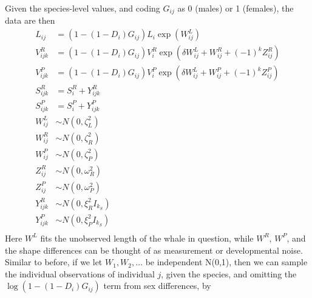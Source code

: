 \documentclass{article}
\begin{document}
Given the species-level values,
and coding $G_{ij}$ as 0 (males) or 1 (females),
the data are then
\begin{align}
    L_{ij} &= (1-(1-D_i)G_{ij}) L_i \exp( W^L_{ij} ) \\
    V^R_{ijk} &= (1-(1-D_i)G_{ij}) V^R_i \exp( \delta W^L_{ij} + W^R_{ij} + (-1)^k Z^R_{ij} ) \\
    V^P_{ijk} &= (1-(1-D_i)G_{ij}) V^P_i \exp( \delta W^L_{ij} + W^P_{ij} + (-1)^k Z^P_{ij} ) \\
    S^R_{ijk} &= S^R_i + Y^R_{ijk} \\
    S^P_{ijk} &= S^P_i + Y^P_{ijk} \\
    W^L_{ij} &\sim N(0,\zeta^2_L) \\
    W^R_{ij} &\sim N(0,\zeta^2_{R}) \\
    W^P_{ij} &\sim N(0,\zeta^2_{P}) \\
    Z^R_{ij} &\sim N(0,\omega^2_{R}) \\
    Z^P_{ij} &\sim N(0,\omega^2_{P}) \\
    Y^R_{ijk} &\sim N(0,\xi^2_R I_{k_S}) \\
    Y^P_{ijk} &\sim N(0,\xi^2_P I_{k_S}) \\
\end{align}
Here $W^L$ fits the unobserved length of the whale in question,
while $W^R$, $W^P$, and the shape differences can be thought of as measurement or developmental noise.
Similar to before, if we let $W_1, W_2, \ldots$ be independent N(0,1), 
then we can sample the individual observations of individual $j$, given the species, 
and omitting the 
$\log\left( 1-(1-D_i)G_{ij} \right)$ term from sex differences, by
\end{document}
